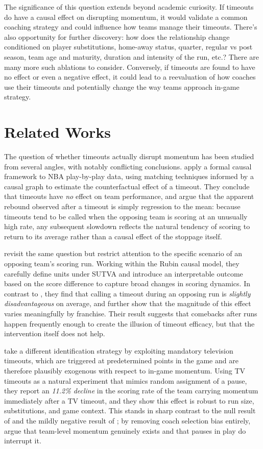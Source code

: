 \documentclass[twoside,11pt]{article}
\begin{document}
The significance of this question extends beyond academic curiosity. If timeouts do have a causal effect on
disrupting momentum, it would validate a common coaching strategy and could influence how teams manage their
timeouts. There's also opportunity for further discovery: how does the relationship change conditioned on
player substitutions, home-away status, quarter, regular vs post season, team age and
maturity, duration and intensity of the run, etc.? There are many more such ablations to consider. Conversely,
if timeouts are found to have no effect or even a negative effect, it could lead to a reevaluation of how
coaches use their timeouts and potentially change the way teams approach in-game strategy.

\section{Related Works}

The question of whether timeouts actually disrupt momentum has been studied from several angles, with notably
conflicting conclusions. \citet{assis2020stop} apply a formal causal framework to NBA play-by-play data,
using matching techniques informed by a causal graph to estimate the counterfactual effect of a timeout. They
conclude that timeouts have \emph{no} effect on team performance, and argue that the apparent rebound
observed after a timeout is simply regression to the mean: because timeouts tend to be called when the
opposing team is scoring at an unusually high rate, any subsequent slowdown reflects the natural tendency of
scoring to return to its average rather than a causal effect of the stoppage itself.

\citet{gibbs2021causal} revisit the same question but restrict attention to the specific scenario of an
opposing team's scoring run. Working within
the Rubin causal model, they carefully define units under SUTVA and introduce an interpretable outcome based
on the score difference to capture broad changes in scoring dynamics. In contrast to \citet{assis2020stop},
they find that calling a timeout during an opposing run is \emph{slightly disadvantageous} on average, and
further show that the magnitude of this effect varies meaningfully by franchise. Their result suggests that
comebacks after runs happen frequently enough to create the illusion of timeout efficacy, but that the
intervention itself does not help.

\citet{weimer2023causal} take a different identification strategy by exploiting mandatory television
timeouts, which are triggered at predetermined points in the game and are therefore plausibly exogenous with
respect to in-game momentum. Using TV timeouts as a natural experiment that mimics random assignment of a
pause, they report an \emph{11.2\% decline} in the scoring rate of the team carrying momentum immediately
after a TV timeout, and they show this effect is robust to run size, substitutions, and game context. This
stands in sharp contrast to the null result of \citet{assis2020stop} and the mildly negative result of
\citet{gibbs2021causal}; by removing coach selection bias entirely, \citet{weimer2023causal} argue that
team-level momentum genuinely exists and that pauses in play do interrupt it.
\end{document}

